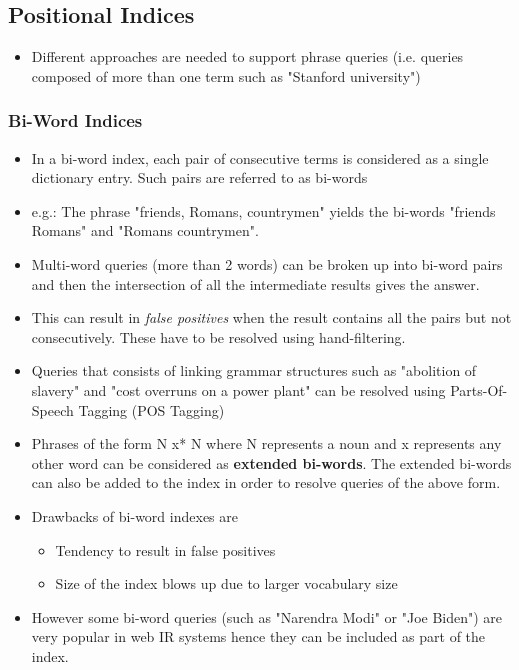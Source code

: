 \documentclass{article}
\begin{document}
\subsection{Positional Indices}
\begin{itemize}
    \item Different approaches are needed to support phrase queries (i.e. queries composed of more than one term such as "Stanford university")
\end{itemize}

\subsubsection{Bi-Word Indices}
\begin{itemize}
    \item In a bi-word index, each pair of consecutive terms is considered as a single dictionary entry. Such pairs are referred to as bi-words
    
    \item e.g.: The phrase "friends, Romans, countrymen" yields the bi-words "friends Romans" and "Romans countrymen". 
    
    \item Multi-word queries (more than 2 words) can be broken up into bi-word pairs and then the intersection of all the intermediate results gives the answer. 
    
    \item This can result in \textit{false positives} when the result contains all the pairs but not consecutively. These have to be resolved using hand-filtering.
    
    \item Queries that consists of linking grammar structures such as "abolition of slavery" and "cost overruns on a power plant" can be resolved using Parts-Of-Speech Tagging (POS Tagging)
    
    \item Phrases of the form N x* N where N represents a noun and x represents any other word can be considered as \textbf{extended bi-words}. The extended bi-words can also be added to the index in order to resolve queries of the above form. 
    
    \item Drawbacks of bi-word indexes are
    \begin{itemize}
        \item Tendency to result in false positives
        
        \item Size of the index blows up due to larger vocabulary size
    \end{itemize}
    
    \item However some bi-word queries (such as "Narendra Modi" or "Joe Biden") are very popular in web IR systems hence they can be included as part of the index. 
\end{itemize}
\end{document}
